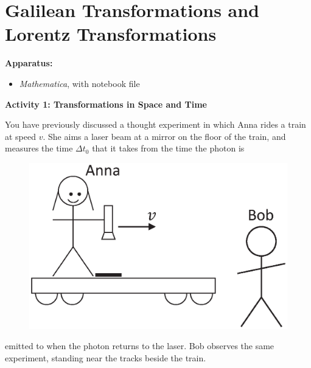 \section{Galilean Transformations and Lorentz Transformations}


\makelabheader %

\bigskip
\textbf{Apparatus:}
\begin{itemize}[nosep]
\item \textit{Mathematica}, with notebook file 
\end{itemize}


\bigskip


\textbf{Activity 1: Transformations in Space and Time}

You have previously discussed a thought experiment in which Anna rides a train at speed $v$.  She aims a laser beam at a mirror on the floor of the train, and measures the time $\Delta t_0$ that it takes from the time the photon is 
\begin{figure}
\begin{center}
\vspace{-0.3in}
\includegraphics[scale=0.4]{time_dilation_length_contraction/anna_and_bob.eps}
\end{center}
\end{figure}
emitted to when the photon returns to the laser.  Bob observes the same experiment, standing near the tracks beside the train.  



